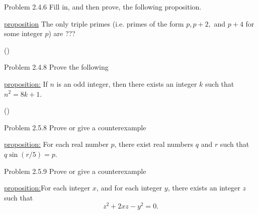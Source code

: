 \documentclass{article}
\theoremstyle{definition}
\begin{document}
	\noindent Problem 2.4.6  \vspace{0.3cm} Fill in, and then prove, the following proposition.



	\medskip

	\underline{proposition} The only triple primes (i.e. primes of the form $p, p+2,$ and
	$p+4$ for some integer $p$) are ???

	\vspace{0.4cm}

	 ()



	\vspace{1cm}



	\noindent Problem 2.4.8  \vspace{0.3cm} Prove the following

	\underline{proposition:} If $n$ is an odd integer, then there exists
	an integer $k$ such that $n^2=8k+1$.

	\vspace{0.4cm}

	 ()



	\vspace{1cm}


	\noindent Problem 2.5.8 Prove or give a counterexample \vspace{0.3cm}

	\underline{proposition:} For each real number $p$, there exist real numbers $q$ and $r$ such that $q\sin(r/5)=p.$

	\vspace{0.3cm}



	\vspace{0.2cm}



	\vspace{1cm}




	\noindent Problem 2.5.9 Prove or give a counterexample  \vspace{0.3cm}

	\underline{proposition:}For each integer $x$, and for each integer $y$, there exists an integer $z$ such that $$z^2+2xz-y^2=0.$$

	\vspace{0.4cm}

\end{document}
